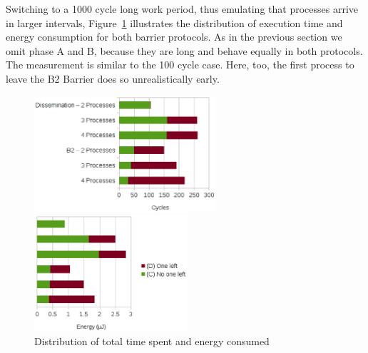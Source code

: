 \documentclass[a4paper, 10pt]{article}
\begin{document}
Switching to a 1000 cycle long work period, thus emulating that processes arrive in larger intervals, Figure~\ref{fig:d2-work-1000-partition} illustrates the distribution of execution time and energy consumption for both barrier protocols.
As in the previous section we omit phase A and B, because they are long and behave equally in both protocols.
The measurement is similar to the 100 cycle case. Here, too, the first process to leave the B2 Barrier does so unrealistically early.
\begin{figure}[htbp]
	\centering
	\begin{minipage}{0.54\linewidth}
		\includegraphics[height=4.3cm]{charts/d2-time-work-1000-partition}
	\end{minipage}
	\begin{minipage}{0.45\linewidth}
		\includegraphics[height=4.3cm]{charts/d2-energy-work-1000-partition}
	\end{minipage}
	\caption{Distribution of total time spent and energy consumed}
	\label{fig:d2-work-1000-partition}
\end{figure}
\end{document}
